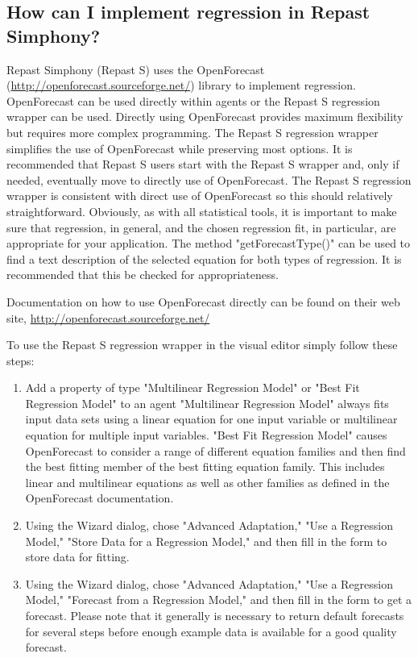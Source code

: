 \documentclass[11pt]{article}
\begin{document}
\subsection{How can I implement regression in Repast Simphony?}
\label{prs:regression}
Repast Simphony (Repast S) uses the OpenForecast (\url{http://openforecast.sourceforge.net/}) library to implement regression. OpenForecast can be used directly within agents or the Repast S regression wrapper can be used. Directly using OpenForecast provides maximum flexibility but requires more complex programming. The Repast S regression wrapper simplifies the use of OpenForecast while preserving most options. It is recommended that Repast S users start with the Repast S wrapper and, only if needed, eventually move to directly use of OpenForecast. The Repast S regression wrapper is consistent with direct use of OpenForecast so this should relatively straightforward. Obviously, as with all statistical tools, it is important to make sure that regression, in general, and the chosen regression fit, in particular, are appropriate for your application. The method "getForecastType()" can be used to find a text description of the selected equation for both types of regression. It is recommended that this be checked for appropriateness.

Documentation on how to use OpenForecast directly can be found on their web site, \url{http://openforecast.sourceforge.net/}

To use the Repast S regression wrapper in the visual editor simply follow these steps:
\begin{enumerate}
\item Add a property of type "Multilinear Regression Model" or "Best Fit Regression Model" to an agent "Multilinear Regression Model" always fits input data sets using a linear equation for one input variable or multilinear equation for multiple input variables. "Best Fit Regression Model" causes OpenForecast to consider a range of different equation families and then find the best fitting member of the best fitting equation family. This includes linear and multilinear equations as well as other families as defined in the OpenForecast documentation.
\item Using the Wizard dialog, chose "Advanced Adaptation," "Use a Regression Model," "Store Data for a Regression Model," and then fill in the form to store data for fitting.
\item Using the Wizard dialog, chose "Advanced Adaptation," "Use a Regression Model," "Forecast from a Regression Model," and then fill in the form to get a forecast. Please note that it generally is necessary to return default forecasts for several steps before enough example data is available for a good quality forecast.
\end{enumerate}
\end{document}
